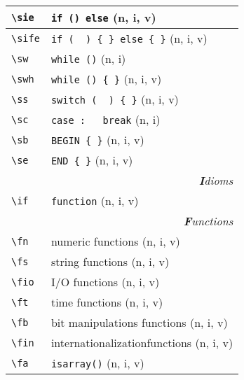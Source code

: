 \documentclass[oneside,10pt,landscape,DIV16]{scrartcl}
\begin{document}
\begin{multicols}{3}
\begin{center}
\begin{tabular}[]{|p{11mm}|p{60mm}|}
\hline \verb'\sie'     & \verb'if () else'            \hfill (n, i, v)\\
\hline \verb'\sife'    & \verb'if (  ) { } else { }'  \hfill (n, i, v)\\
\hline \verb'\sw'      & \verb'while ()'              \hfill (n, i)\\
\hline \verb'\swh'     & \verb'while () { }'          \hfill (n, i, v)\\
\hline \verb'\ss'      & \verb'switch (  ) { }'       \hfill (n, i, v)\\
\hline \verb'\sc'      & \verb'case :	break'          \hfill (n, i)\\
\hline \verb'\sb'      & \verb'BEGIN { }'             \hfill (n, i, v)\\
\hline \verb'\se'      & \verb'END { }'               \hfill (n, i, v)\\
\hline
\hline
\multicolumn{2}{|r|}{\textsl{\textbf{I}dioms}}                 \\[1.0ex]
\hline \verb'\if' & \verb'function'            \hfill (n, i, v)\\
\hline
\hline
\hline
\multicolumn{2}{|r|}{\textsl{\textbf{F}unctions}}              \\[1.0ex]
\hline \verb'\fn ' & numeric functions                       \hfill (n, i, v)\\
\hline \verb'\fs ' & string functions                        \hfill (n, i, v)\\
\hline \verb'\fio' & I/O functions                           \hfill (n, i, v)\\
\hline \verb'\ft ' & time functions                          \hfill (n, i, v)\\
\hline \verb'\fb ' & bit manipulations functions             \hfill (n, i, v)\\
\hline \verb'\fin' & internationalizationfunctions           \hfill (n, i, v)\\
\hline \verb'\fa ' & \texttt{isarray()}                      \hfill (n, i, v)\\
\hline

\end{tabular}
\end{center}
\end{multicols}
\end{document}
